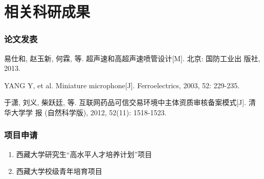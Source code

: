 
\chapter{相关科研成果}

\subsection{论文发表}
\begin{publications}
	\item
	易仕和, 赵玉新, 何霖, 等. 超声速和高超声速喷管设计[M]. 北京: 国防工业出
	版社, 2013.
	\item 
	YANG Y, et al. Miniature microphone[J]. Ferroelectrics, 2003, 52: 229-235.
	\item 
	于潇, 刘义, 柴跃廷, 等. 互联网药品可信交易环境中主体资质审核备案模式[J]. 清华大学学
	报 (自然科学版), 2012, 52(11): 1518-1523.
	
	
\end{publications}
\subsection{项目申请}
\begin{enumerate}
	\item
	西藏大学研究生“高水平人才培养计划”项目
	\item 
	西藏大学校级青年培育项目
\end{enumerate}

